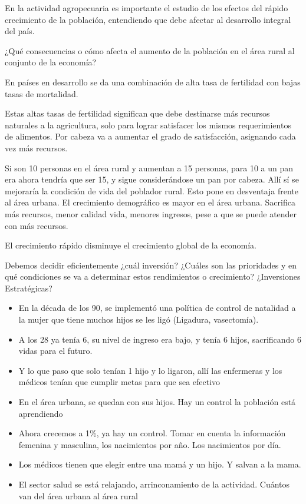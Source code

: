 \documentclass[
  letterpaper,
  DIV=11,
  numbers=noendperiod]{scrartcl}
\begin{document}
En la actividad agropecuaria es importante el estudio de los efectos del
rápido crecimiento de la población, entendiendo que debe afectar al
desarrollo integral del país.

¿Qué consecuencias o cómo afecta el aumento de la población en el área
rural al conjunto de la economía?

En países en desarrollo se da una combinación de alta tasa de fertilidad
con bajas tasas de mortalidad.

Estas altas tasas de fertilidad significan que debe destinarse más
recursos naturales a la agricultura, solo para lograr satisfacer los
mismos requerimientos de alimentos. Por cabeza va a aumentar el grado de
satisfacción, asignando cada vez más recursos.

Si son 10 personas en el área rural y aumentan a 15 personas, para 10 a
un pan era ahora tendría que ser 15, y sigue considerándose un pan por
cabeza. Allí sí se mejoraría la condición de vida del poblador rural.
Esto pone en desventaja frente al área urbana. El crecimiento
demográfico es mayor en el área urbana. Sacrifica más recursos, menor
calidad vida, menores ingresos, pese a que se puede atender con más
recursos.

El crecimiento rápido disminuye el crecimiento global de la economía.

Debemos decidir eficientemente ¿cuál inversión? ¿Cuáles son las
prioridades y en qué condiciones se va a determinar estos rendimientos o
crecimiento? ¿Inversiones Estratégicas?

\begin{itemize}
\item
  En la década de los 90, se implementó una política de control de
  natalidad a la mujer que tiene muchos hijos se les ligó (Ligadura,
  vasectomía).
\item
  A los 28 ya tenía 6, su nivel de ingreso era bajo, y tenía 6 hijos,
  sacrificando 6 vidas para el futuro.
\item
  Y lo que paso que solo tenían 1 hijo y lo ligaron, allí las enfermeras
  y los médicos tenían que cumplir metas para que sea efectivo
\item
  En el área urbana, se quedan con sus hijos. Hay un control la
  población está aprendiendo
\item
  Ahora crecemos a 1\%, ya hay un control. Tomar en cuenta la
  información femenina y masculina, los nacimientos por año. Los
  nacimientos por día.
\item
  Los médicos tienen que elegir entre una mamá y un hijo. Y salvan a la
  mama.
\item
  El sector salud se está relajando, arrinconamiento de la actividad.
  Cuántos van del área urbana al área rural
\end{itemize}
\end{document}
